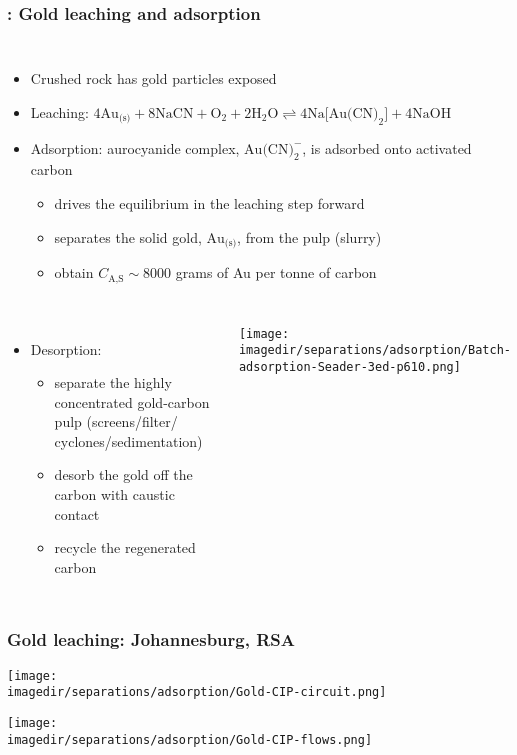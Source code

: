 \begin{frame}\frametitle{{\color{myOrange}{Example}}: Gold leaching and adsorption}
	\begin{columns}[c]
			\begin{itemize}
				\item	Crushed rock has gold particles exposed
				\item	Leaching: $4\text{Au}_\text{(s)} + 8\text{NaCN} + \text{O}_2 + 2 \text{H}_2\text{O} \rightleftharpoons  4 \text{Na[Au(CN)}_2\text{]} + 4 \text{NaOH}$
				\item	Adsorption: aurocyanide complex, $\text{Au(CN)}_2^{-}$, is adsorbed onto activated carbon
					\begin{itemize}
						\item	drives the equilibrium in the leaching step forward
						\item	separates the solid gold, $\text{Au}_\text{(s)}$, from the pulp (slurry)
						\item	obtain $C_\text{A,S} \sim 8000$ grams of Au per tonne of carbon
					\end{itemize}
			\end{itemize}
	\end{columns}
	\begin{columns}[t]
			\begin{itemize}
				\item	Desorption:
					\begin{itemize}
						\item	separate the highly concentrated gold-carbon pulp (screens/filter/ cyclones/sedimentation)
						\item	desorb the gold off the carbon with caustic contact
						\item	recycle the regenerated carbon
					\end{itemize}
			\end{itemize}
			\begin{center}
				\texttt{[image: \\imagedir/separations/adsorption/Batch-adsorption-Seader-3ed-p610.png]}
			\end{center}
	\end{columns}
\end{frame}

\begin{frame}\frametitle{Gold leaching: Johannesburg, RSA}
	\begin{center}
		\texttt{[image: \\imagedir/separations/adsorption/Gold-CIP-circuit.png]}
	\end{center}
	\begin{center}
		\texttt{[image: \\imagedir/separations/adsorption/Gold-CIP-flows.png]}
	\end{center}
	\vspace{-12pt}
\end{frame}

